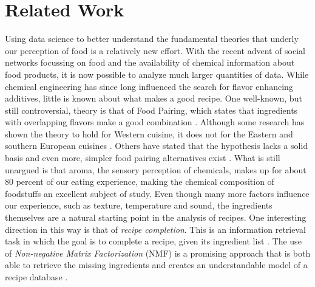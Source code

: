 \section{Related Work}
\label{sec:related_work}

Using data science to better understand the fundamental theories that underly our perception of food is a relatively new effort.
With the recent advent of social networks focussing on food and the availability of chemical information about food products, it is now possible to analyze much larger quantities of data.
While chemical engineering has since long influenced the search for flavor enhancing additives, little is known about what makes a good recipe.
One well-known, but still controversial, theory is that of Food Pairing\textsuperscript{\textregistered}, which states that ingredients with overlapping flavors make a good combination \citep{FoodPairing}.
Although some research has shown the theory to hold for Western cuisine, it does not for the Eastern and southern European cuisines \citep{Ahn2011}\citep{Jain2015}.
Others have stated that the hypothesis lacks a solid basis and even more, simpler food pairing alternatives exist \citep{Klepper2011}.
What is still unargued is that aroma, the sensory perception of chemicals, makes up for about $80$ percent of our eating experience, making the chemical composition of foodstuffs an excellent subject of study.
Even though many more factors influence our experience, such as texture, temperature and sound, the ingredients themselves are a natural starting point in the analysis of recipes.
One interesting direction in this way is that of \emph{recipe completion}.
This is an information retrieval task in which the goal is to complete a recipe, given its ingredient list \citep{Clercq2016}.
The use of \emph{Non-negative Matrix Factorization} (NMF) is a promising approach that is both able to retrieve the missing ingredients and creates an understandable model of a recipe database \citep{Zetlaoui2011}\citep{Clercq2016}.